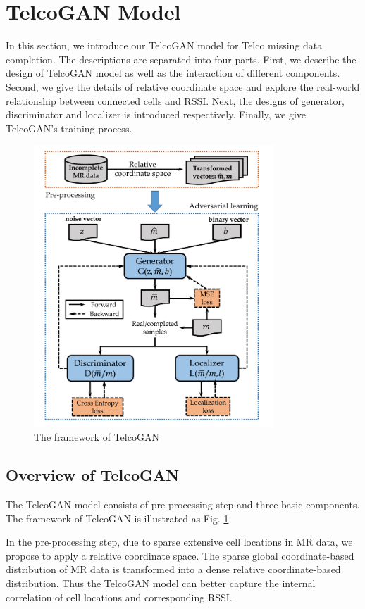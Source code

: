 \section{TelcoGAN Model}
In this section, we introduce our TelcoGAN model for Telco missing data completion. The descriptions are separated into four parts. First, we describe the design of TelcoGAN model as well as the interaction of different components. Second, we give the details of relative coordinate space and explore the real-world relationship between connected cells and RSSI. Next, the designs of generator, discriminator and localizer is introduced respectively. Finally, we give TelcoGAN's training process.

\begin{figure}
  \centering
  \includegraphics[width=9cm]{pics/framework.pdf}
  \caption{The framework of TelcoGAN}\label{fig:framework}
\end{figure}


\subsection{Overview of TelcoGAN}
The TelcoGAN model consists of pre-processing step and three basic components. The framework of TelcoGAN is illustrated as Fig. \ref{fig:framework}.

In the pre-processing step, due to sparse extensive cell locations in MR data, we propose to apply a relative coordinate space. The sparse global coordinate-based distribution of MR data is transformed into a dense relative coordinate-based distribution. Thus the TelcoGAN model can better capture the internal correlation of cell locations and corresponding RSSI.


